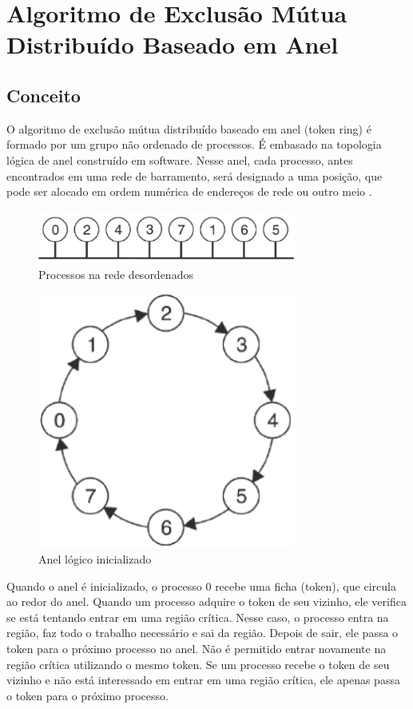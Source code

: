 \documentclass[10pt,conference]{IEEEtran}
\begin{document}
\section{Algoritmo de Exclusão Mútua Distribuído Baseado em Anel}
\subsection{Conceito}
O algoritmo de exclusão mútua distribuído baseado em anel (token ring) é formado por um grupo não ordenado de processos. É embasado na topologia lógica de anel construído em software. Nesse anel, cada processo, antes encontrados em uma rede de barramento, será designado a uma posição, que pode ser alocado em ordem numérica de endereços de rede ou outro meio \cite{compdistaline}. 

\begin{figure}[h]
    \centering    \includegraphics[width=8.5cm]{images/exclusaomutuaanel.png}
    \caption{Processos na rede desordenados}
    \label{fig:enter-label}
\end{figure}
\begin{figure}[h]
    \centering    \includegraphics[width=8.5cm]{images/exclusaomutuaanel2.png}
    \caption{Anel lógico inicializado}
    \label{fig:enter-label}
\end{figure}

Quando o anel é inicializado, o processo 0 recebe uma ficha (token), que circula ao redor do anel. Quando um processo adquire o token de seu vizinho, ele verifica se está tentando entrar em uma região crítica. Nesse caso, o processo entra na região, faz todo o trabalho necessário e sai da região. Depois de sair, ele passa o token para o próximo processo no anel. Não é permitido entrar novamente na região crítica utilizando o mesmo token. Se um processo recebe o token de seu vizinho e não está interessado em entrar em uma região crítica, ele apenas passa o token para o próximo processo. \cite{tanenbaum}
\end{document}
